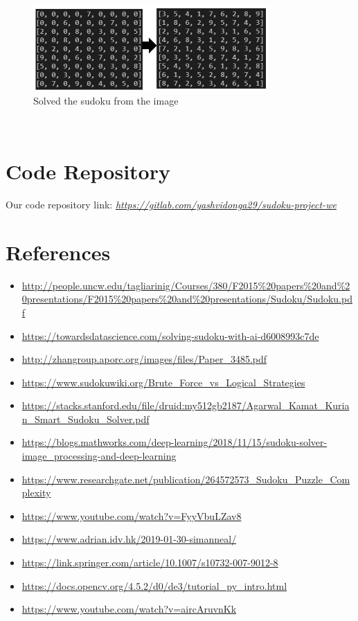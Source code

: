 \documentclass[12pt]{article}
\begin{document}
	\begin{figure}[htp]
			  \includegraphics[width=0.8\textwidth]{./week9_img/solve.PNG}
			  \centering
		  \caption{Solved the sudoku from the image}
		  \centering
		  \end{figure}\\
    \section{Code Repository} 
    Our code repository link: \href{https://gitlab.com/yashvidonga29/sudoku-project-we}{\emph{https://gitlab.com/yashvidonga29/sudoku-project-we}}
    \section{References}   
    \begin{itemize}
         \item \sloppy \url{http://people.uncw.edu/tagliarinig/Courses/380/F2015%20papers%20and%20presentations/F2015%20papers%20and%20presentations/Sudoku/Sudoku.pdf}
        \item \sloppy \url{https://towardsdatascience.com/solving-sudoku-with-ai-d6008993c7de}
        \item \sloppy \url{http://zhangroup.aporc.org/images/files/Paper_3485.pdf}
        \item \sloppy \url{https://www.sudokuwiki.org/Brute_Force_vs_Logical_Strategies}
        \item \sloppy \url{https://stacks.stanford.edu/file/druid:my512gb2187/Agarwal_Kamat_Kurian_Smart_Sudoku_Solver.pdf}
        \item \sloppy \url{https://blogs.mathworks.com/deep-learning/2018/11/15/sudoku-solver-image_processing-and-deep-learning}
        \item \sloppy \url{https://www.researchgate.net/publication/264572573_Sudoku_Puzzle_Complexity}
        \item \sloppy \url{https://www.youtube.com/watch?v=FyyVbuLZav8}
        \item \sloppy \url{https://www.adrian.idv.hk/2019-01-30-simanneal/}
        \item \sloppy \url{https://link.springer.com/article/10.1007/s10732-007-9012-8}
        \item \sloppy \url{https://docs.opencv.org/4.5.2/d0/de3/tutorial_py_intro.html}
        \item \sloppy \url{https://www.youtube.com/watch?v=aircAruvnKk}
    \end{itemize}
\end{document}
